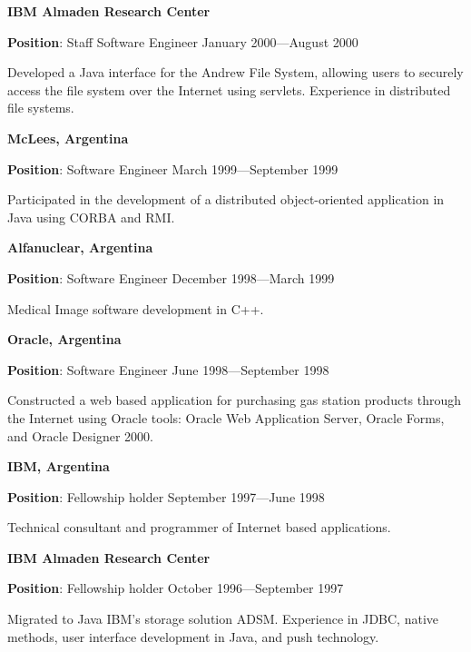 \documentclass{article}
\begin{document}
\vspace{2\baselineskip}
{\bf IBM Almaden Research Center}
\par
{\bf Position}:  Staff Software Engineer
\hspace*{\fill} January 2000---August 2000
\par
Developed a Java interface for the Andrew File System, allowing users to
securely access the file system over the Internet using servlets. Experience
in distributed file systems.

\par
\vspace{.1in}
{\bf McLees, Argentina}
\par
{\bf Position}:  Software Engineer  \hfill March 1999---September 1999
\par
Participated in the development of a distributed object-oriented application in Java using CORBA and RMI.

\par
\vspace{.1in}
{\bf Alfanuclear, Argentina}
\par
{\bf Position}:  Software Engineer  \hfill December 1998---March 1999
\par
Medical Image software development in C++.

\par
\vspace{.1in}
{\bf Oracle, Argentina}
\par
{\bf Position}:  Software Engineer  \hfill June 1998---September 1998
\par
Constructed a web based application for purchasing gas station products through
the Internet using Oracle tools: Oracle Web Application Server, Oracle
Forms, and Oracle Designer 2000.

\par
\vspace{.1in}
{\bf IBM, Argentina}
\par
{\bf Position}:  Fellowship holder  \hfill September 1997---June 1998
\par
Technical consultant and programmer of Internet based applications.

\vspace{.1in}
{\bf IBM Almaden Research Center}
\nopagebreak
\par
{\bf Position}:  Fellowship holder  \hfill October 1996---September 1997
\nopagebreak
\par
Migrated to Java IBM's storage solution ADSM. Experience in JDBC, native
methods, user interface development in Java, and push technology.
\end{document}
